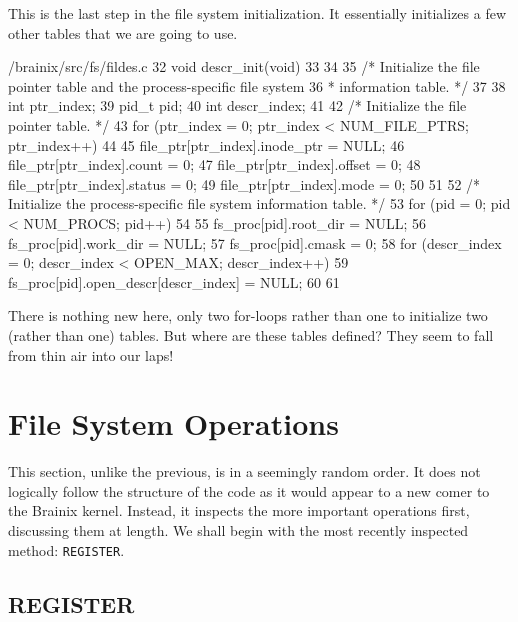 \documentclass{article}
\begin{document}
This is the last step in the file system initialization. It essentially initializes a few other tables that we are going to use.
\begin{code}{/brainix/src/fs/fildes.c}
32 void descr_init(void)
33 {
34 
35 /* Initialize the file pointer table and the process-specific file system
36  * information table. */
37 
38      int ptr_index;
39      pid_t pid;
40      int descr_index;
41 
42      /* Initialize the file pointer table. */
43      for (ptr_index = 0; ptr_index < NUM_FILE_PTRS; ptr_index++)
44      {
45           file_ptr[ptr_index].inode_ptr = NULL;
46           file_ptr[ptr_index].count = 0;
47           file_ptr[ptr_index].offset = 0;
48           file_ptr[ptr_index].status = 0;
49           file_ptr[ptr_index].mode = 0;
50      }
51 
52      /* Initialize the process-specific file system information table. */
53      for (pid = 0; pid < NUM_PROCS; pid++)
54      {
55           fs_proc[pid].root_dir = NULL;
56           fs_proc[pid].work_dir = NULL;
57           fs_proc[pid].cmask = 0;
58           for (descr_index = 0; descr_index < OPEN_MAX; descr_index++)
59                fs_proc[pid].open_descr[descr_index] = NULL;
60      }
61 }
\end{code}
There is nothing new here, only two for-loops rather than one to initialize two (rather than one) tables. But where are these tables defined? They seem to fall from thin air into our laps!


 

\section{File System Operations}

This section, unlike the previous, is in a seemingly random order. It does not logically follow the structure of the code as it would appear to a new comer to the Brainix kernel. Instead, it inspects the more important operations first, discussing them at length. We shall begin with the most recently inspected method: \verb|REGISTER|.

\subsection{REGISTER}
\end{document}
